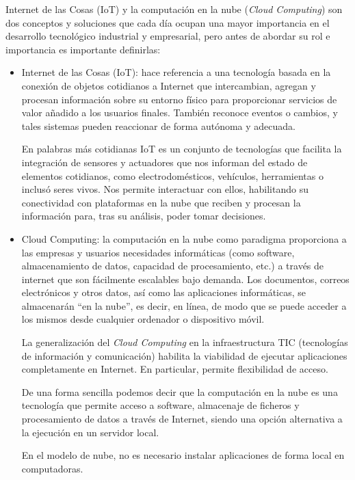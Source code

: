 Internet de las Cosas (IoT) y la computación en la nube (\emph{Cloud Computing}) son dos conceptos y soluciones que cada día ocupan una mayor importancia en el desarrollo tecnológico industrial y empresarial, pero antes de abordar su rol e importancia es importante definirlas:



\begin{itemize}
\item Internet de las Cosas (IoT): hace referencia a una tecnología basada en la conexión de objetos cotidianos a Internet que intercambian, agregan y procesan información sobre su entorno físico para proporcionar servicios de valor añadido a los usuarios finales. También reconoce eventos o cambios, y tales sistemas pueden reaccionar de forma autónoma y adecuada.

En palabras más cotidianas IoT es un conjunto de tecnologías que facilita la integración de sensores y actuadores que nos informan del estado de elementos cotidianos, como electrodomésticos, vehículos, herramientas o inclusó seres vivos. Nos permite interactuar con ellos, habilitando su conectividad con plataformas en la nube que reciben y procesan la información para, tras su análisis, poder tomar decisiones.

\item Cloud Computing: la computación en la nube como paradigma proporciona a las empresas y usuarios necesidades informáticas (como software, almacenamiento de datos, capacidad de procesamiento, etc.) a través de internet que son fácilmente escalables bajo demanda. Los documentos, correos electrónicos y otros datos, así como las aplicaciones informáticas, se almacenarán ``en la nube'', es decir, en línea, de modo que se puede acceder a los mismos desde cualquier ordenador o dispositivo móvil.

La generalización del \emph{Cloud Computing} en la infraestructura TIC (tecnologías de información y comunicación) habilita la viabilidad de ejecutar aplicaciones completamente en Internet. En particular, permite flexibilidad de acceso.

De una forma sencilla podemos decir que la computación en la nube es una tecnología que permite acceso a software, almacenaje de ficheros y procesamiento de datos a través de Internet, siendo una opción alternativa a la ejecución en un servidor local. 

En el modelo de nube, no es necesario instalar aplicaciones de forma local en computadoras.

\end{itemize}

